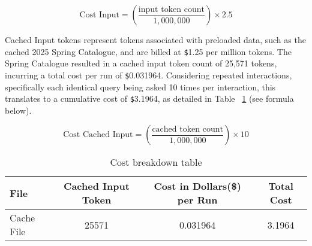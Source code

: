 \documentclass[12pt,oneside,openany]{report}
\begin{document}
\[
\text{Cost Input} = \left(\frac{\text{input token count}}{1,000,000}\right) \times 2.5
\]

\begin{table}[H]
\centering
{}
\caption{Cost Summary by Question}
\label{tab:cost-summary}
\end{table}


Cached Input tokens represent tokens associated with preloaded data, such as the cached 2025 Spring Catalogue, and are billed at \verb|$|1.25 per million tokens\cite{openaiAPIPricing}. The Spring Catalogue resulted in a cached input token count of 25,571 tokens, incurring a total cost per run of \verb|$|0.031964. Considering repeated interactions, specifically each identical query being asked 10 times per interaction, this translates to a cumulative cost of \verb|$|3.1964, as detailed in Table ~\ref{tab:cost_breakdown} (see formula below).

\[
\text{Cost Cached Input} = \left(\frac{\text{cached token count}}{1,000,000}\right) \times 10
\]

\begin{table}[H]
\centering
\begin{tabular}{l c c c}
\hline
\textbf{File} & \textbf{Cached Input Token} & \textbf{Cost in Dollars(\$) per Run} & \textbf{Total Cost} \\
\hline
Cache File & 25571 & 0.031964 & 3.1964 \\
\hline
\end{tabular}
\caption{Cost breakdown table}
\label{tab:cost_breakdown}
\end{table}
\end{document}
